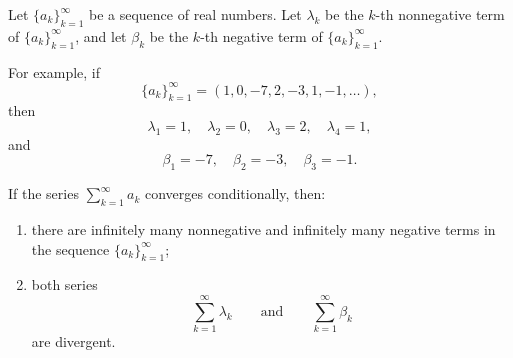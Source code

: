 \begin{claim}\label{claim:3.10}
Let $\{a_k\}_{k=1}^{\infty}$ be a sequence of real numbers. Let $\lambda_k$ be the $k$-th nonnegative term of $\{a_k\}_{k=1}^{\infty}$, and let $\beta_k$ be the $k$-th negative term of $\{a_k\}_{k=1}^{\infty}$.

For example, if
\[
\{a_k\}_{k=1}^{\infty}=(1,0,-7,2,-3,1,-1,\ldots),
\]
then
\[
\lambda_1=1,\quad \lambda_2=0,\quad \lambda_3=2,\quad \lambda_4=1,
\]
and
\[
\beta_1=-7,\quad \beta_2=-3,\quad \beta_3=-1.
\]

If the series $\sum_{k=1}^{\infty}a_k$ converges conditionally, then:
\begin{enumerate}[label=\arabic*)]
\item\label{item:claim:3.10:1} there are infinitely many nonnegative and infinitely many negative terms in the sequence $\{a_k\}_{k=1}^{\infty}$;
\item\label{item:claim:3.10:2} both series
\[
\sum_{k=1}^{\infty}\lambda_k
\qquad\text{and}\qquad
\sum_{k=1}^{\infty}\beta_k
\]
are divergent.
\end{enumerate}
\end{claim}

